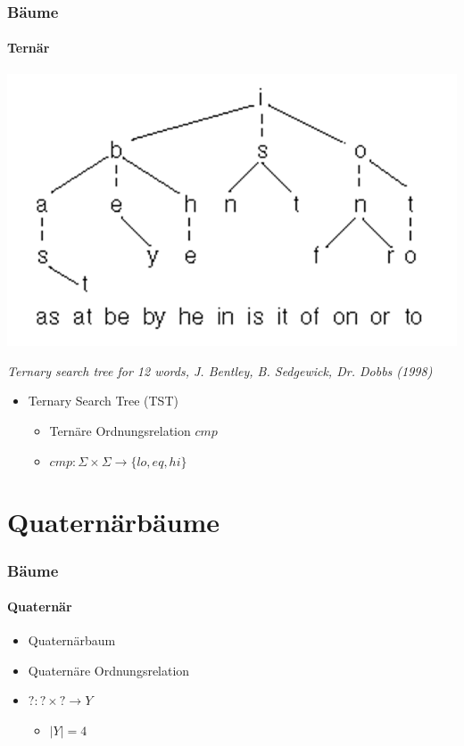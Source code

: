 \documentclass{beamer}
\begin{document}
\begin{frame}
  \frametitle{Bäume}
  \framesubtitle{Ternär}
  \begin{center}
    \includegraphics[scale=0.5]{rsrc/tst}
    
    \tiny \it Ternary search tree for 12 words, J. Bentley, B. Sedgewick, Dr. Dobbs (1998)
  \end{center}
  \begin{itemize}
    \item Ternary Search Tree (TST)
    \begin{itemize}
      \item Ternäre Ordnungsrelation $cmp$
      \item $cmp:\Sigma \times \Sigma \rightarrow \{lo,eq,hi\}$
    \end{itemize}
  \end{itemize}
\end{frame}

\section{Quaternärbäume}

\begin{frame}
  \frametitle{Bäume}
  \framesubtitle{Quaternär}
  \begin{itemize}
    \item Quaternärbaum
    \item Quaternäre Ordnungsrelation
    \item $?:? \times ? \rightarrow Y$
    \begin{itemize}
      \item $|Y| = 4$
    \end{itemize}
  \end{itemize}
\end{frame}
\end{document}
